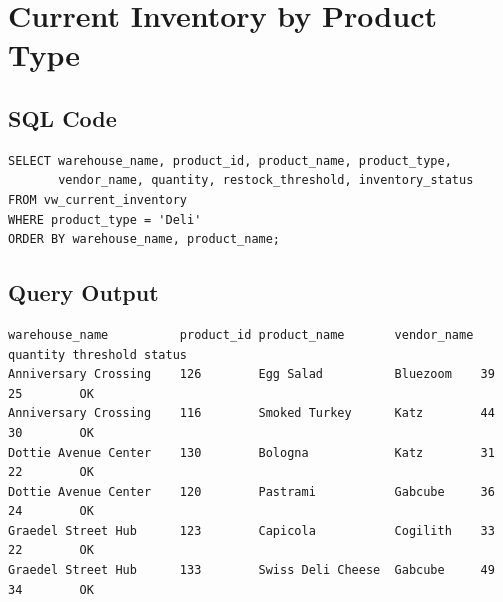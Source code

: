 \section{Current Inventory by Product Type}

\subsection{SQL Code}
{\scriptsize
\begin{verbatim}
SELECT warehouse_name, product_id, product_name, product_type,
       vendor_name, quantity, restock_threshold, inventory_status
FROM vw_current_inventory
WHERE product_type = 'Deli'
ORDER BY warehouse_name, product_name;
\end{verbatim}
}

\subsection{Query Output}
{\scriptsize
\begin{verbatim}
warehouse_name          product_id product_name       vendor_name quantity threshold status
Anniversary Crossing    126        Egg Salad          Bluezoom    39       25        OK
Anniversary Crossing    116        Smoked Turkey      Katz        44       30        OK
Dottie Avenue Center    130        Bologna            Katz        31       22        OK
Dottie Avenue Center    120        Pastrami           Gabcube     36       24        OK
Graedel Street Hub      123        Capicola           Cogilith    33       22        OK
Graedel Street Hub      133        Swiss Deli Cheese  Gabcube     49       34        OK
\end{verbatim}
}
